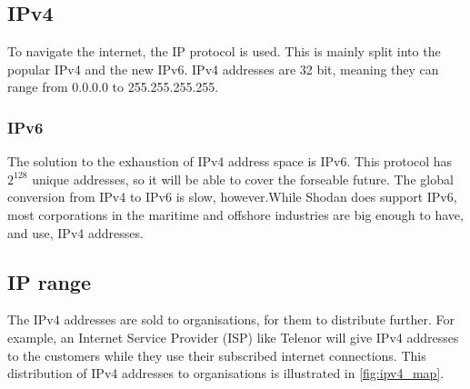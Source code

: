 \subsection{IPv4}
To navigate the internet, the IP protocol is used. This is mainly split into the popular IPv4 and the new IPv6. IPv4 addresses are 32 bit, meaning they can range from 0.0.0.0 to 255.255.255.255. 

\subsubsection{IPv6}
The solution to the exhaustion of IPv4 address space is IPv6. This protocol has $2^{128}$ unique addresses, so it will be able to cover the forseable future. The global conversion from IPv4 to IPv6 is slow, however.While Shodan does support IPv6, most corporations in the maritime and offshore industries are big enough to have, and use, IPv4 addresses. 


\subsection{IP range}
 The IPv4 addresses are sold to organisations, for them to distribute further. For example, an Internet Service Provider (ISP) like Telenor will give IPv4 addresses to the customers while they use their subscribed internet connections. This distribution of IPv4 addresses to organisations is illustrated in \cref{fig:ipv4_map}.

